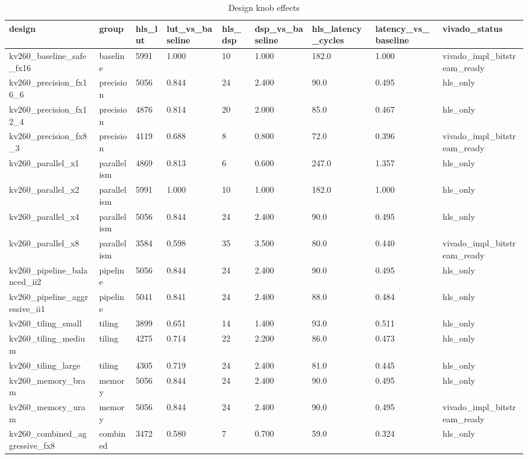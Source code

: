 \begin{table}[t]
\centering
\scriptsize
\setlength{\tabcolsep}{3pt}
\begin{tabular}{lllllllll}
\hline
design & group & hls\_lut & lut\_vs\_baseline & hls\_dsp & dsp\_vs\_baseline & hls\_latency\_cycles & latency\_vs\_baseline & vivado\_status \\
\hline
kv260\_baseline\_safe\_fx16 & baseline & 5991 & 1.000 & 10 & 1.000 & 182.0 & 1.000 & vivado\_impl\_bitstream\_ready \\
kv260\_precision\_fx16\_6 & precision & 5056 & 0.844 & 24 & 2.400 & 90.0 & 0.495 & hls\_only \\
kv260\_precision\_fx12\_4 & precision & 4876 & 0.814 & 20 & 2.000 & 85.0 & 0.467 & hls\_only \\
kv260\_precision\_fx8\_3 & precision & 4119 & 0.688 & 8 & 0.800 & 72.0 & 0.396 & vivado\_impl\_bitstream\_ready \\
kv260\_parallel\_x1 & parallelism & 4869 & 0.813 & 6 & 0.600 & 247.0 & 1.357 & hls\_only \\
kv260\_parallel\_x2 & parallelism & 5991 & 1.000 & 10 & 1.000 & 182.0 & 1.000 & hls\_only \\
kv260\_parallel\_x4 & parallelism & 5056 & 0.844 & 24 & 2.400 & 90.0 & 0.495 & hls\_only \\
kv260\_parallel\_x8 & parallelism & 3584 & 0.598 & 35 & 3.500 & 80.0 & 0.440 & vivado\_impl\_bitstream\_ready \\
kv260\_pipeline\_balanced\_ii2 & pipeline & 5056 & 0.844 & 24 & 2.400 & 90.0 & 0.495 & hls\_only \\
kv260\_pipeline\_aggressive\_ii1 & pipeline & 5041 & 0.841 & 24 & 2.400 & 88.0 & 0.484 & hls\_only \\
kv260\_tiling\_small & tiling & 3899 & 0.651 & 14 & 1.400 & 93.0 & 0.511 & hls\_only \\
kv260\_tiling\_medium & tiling & 4275 & 0.714 & 22 & 2.200 & 86.0 & 0.473 & hls\_only \\
kv260\_tiling\_large & tiling & 4305 & 0.719 & 24 & 2.400 & 81.0 & 0.445 & hls\_only \\
kv260\_memory\_bram & memory & 5056 & 0.844 & 24 & 2.400 & 90.0 & 0.495 & hls\_only \\
kv260\_memory\_uram & memory & 5056 & 0.844 & 24 & 2.400 & 90.0 & 0.495 & vivado\_impl\_bitstream\_ready \\
kv260\_combined\_aggressive\_fx8 & combined & 3472 & 0.580 & 7 & 0.700 & 59.0 & 0.324 & hls\_only \\
\hline
\end{tabular}
\caption{Design knob effects}
\label{tab:table\_4\_knob\_effects}
\end{table}
